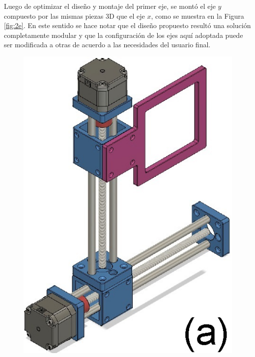 Luego de optimizar el diseño y montaje del primer eje, se montó el eje $\textit{y}$ compuesto por las mismas piezas 3D que el eje $\textit{x}$, como se muestra en la Figura \ref{fig:2e}. En este sentido se hace notar que el diseño propuesto resultó una solución completamente modular y que la configuración de los ejes aquí adoptada puede ser modificada a otras de acuerdo a las necesidades del usuario final. 
 
\begin{figure}[H]
\hfill%
\includegraphics[scale=0.83]{Figs/microespectrometro/scanningstage.jpg}
\hfill%

\end{figure}
